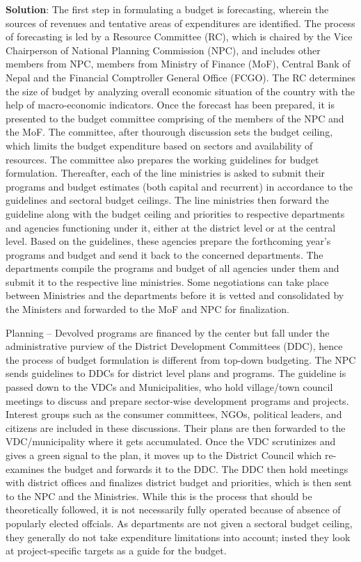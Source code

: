 \documentclass[
]{book}
\newenvironment{solution}{ {\bfseries Solution}:}{}
\begin{document}
\begin{questions}
\begin{solution}
The first step in formulating a budget is forecasting, wherein the sources of revenues and tentative areas of expenditures are identified. The process of forecasting is led by a Resource Committee (RC), which is chaired by the Vice Chairperson of National Planning Commission (NPC), and includes other members from NPC, members from Ministry of Finance (MoF), Central Bank of Nepal and the Financial Comptroller General Office (FCGO). The RC determines the size of budget by analyzing overall economic situation of the country with the help of macro-economic indicators. Once the forecast has been prepared, it is presented to the budget committee comprising of the members of the NPC and the MoF. The committee, after thourough discussion sets the budget ceiling, which limits the budget expenditure based on sectors and availability of resources. The committee also prepares the working guidelines for budget formulation. Thereafter, each of the line ministries is asked to submit their programs and budget estimates (both capital and recurrent) in accordance to the guidelines and sectoral budget ceilings. The line ministries then forward the guideline along with the budget ceiling and priorities to respective departments and agencies functioning under it, either at the district level or at the central level. Based on the guidelines, these agencies prepare the forthcoming year's programs and budget and send it back to the concerned departments. The departments compile the programs and budget of all agencies under them and submit it to the respective line ministries. Some negotiations can take place between Ministries and the departments before it is vetted and consolidated by the Ministers and forwarded to the MoF and NPC for finalization.

Planning -- Devolved programs are financed by the center but fall under the administrative purview of the District Development Committees (DDC), hence the process of budget formulation is different from top-down budgeting. The NPC sends guidelines to DDCs for district level plans and programs. The guideline is passed down to the VDCs and Municipalities, who hold village/town council meetings to discuss and prepare sector-wise development programs and projects. Interest groups such as the consumer committees, NGOs, political leaders, and citizens are included in these discussions. Their plans are then forwarded to the VDC/municipality where it gets accumulated. Once the VDC scrutinizes and gives a green signal to the plan, it moves up to the District Council which re-examines the budget and forwards it to the DDC. The DDC then hold meetings with district offices and finalizes district budget and priorities, which is then sent to the NPC and the Ministries. While this is the process that should be theoretically followed, it is not necessarily fully operated because of absence of popularly elected offcials. As departments are not given a sectoral budget ceiling, they generally do not take expenditure limitations into account; insted they look at project-specific targets as a guide for the budget.


\end{solution}
\end{questions}
\end{document}
